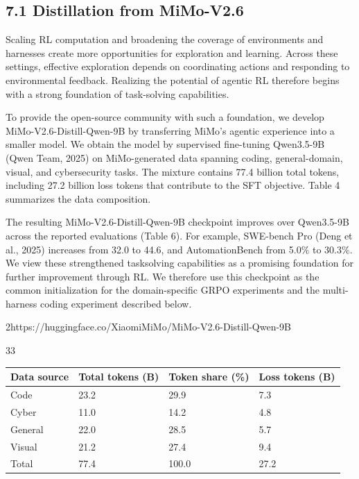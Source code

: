 \documentclass[
  10
]{article}
\newcounter{none} %
\begin{document}
\subsection{7.1 Distillation from
MiMo-V2.6}\label{distillation-from-mimo-v2.6}

Scaling RL computation and broadening the coverage of environments and
harnesses create more opportunities for exploration and learning. Across
these settings, effective exploration depends on coordinating actions and
responding to environmental feedback. Realizing the potential of agentic
RL therefore begins with a strong foundation of task-solving
capabilities.

To provide the open-source community with such a foundation, we develop
MiMo-V2.6-Distill-Qwen-9B by transferring MiMo's agentic experience into
a smaller model. We obtain the model by supervised fine-tuning
Qwen3.5-9B (Qwen Team, 2025) on MiMo-generated data spanning coding,
general-domain, visual, and cybersecurity tasks. The mixture contains
77.4 billion total tokens, including 27.2 billion loss tokens that
contribute to the SFT objective. Table 4 summarizes the data
composition.

The resulting MiMo-V2.6-Distill-Qwen-9B checkpoint improves over
Qwen3.5-9B across the reported evaluations (Table 6). For example,
SWE-bench Pro (Deng et al., 2025) increases from 32.0 to 44.6, and
AutomationBench from 5.0\% to 30.3\%. We view these strengthened
tasksolving capabilities as a promising foundation for further
improvement through RL. We therefore use this checkpoint as the common
initialization for the domain-specific GRPO experiments and the
multi-harness coding experiment described below.

2https://huggingface.co/XiaomiMiMo/MiMo-V2.6-Distill-Qwen-9B

33

{\def\LTcaptype{none} %
\begin{longtable}[]{@{}|l|l|l|l|@{}}
\toprule\noalign{}
\endhead
\bottomrule\noalign{}
\endlastfoot
\hline
Data source & Total tokens (B) & Token share (\%) & Loss tokens (B) \\
\hline
Code & 23.2 & 29.9 & 7.3 \\
\hline
Cyber & 11.0 & 14.2 & 4.8 \\
\hline
General & 22.0 & 28.5 & 5.7 \\
\hline
Visual & 21.2 & 27.4 & 9.4 \\
\hline
Total & 77.4 & 100.0 & 27.2 \\
\hline
\end{longtable}
}
\end{document}
